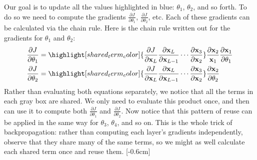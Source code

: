 Our goal is to update all the values highlighted in blue: $\theta_1$, $\theta_2$, and so forth. To do so we need to compute the gradients $\frac{\partial J}{\partial \theta_1}$, $\frac{\partial J}{\partial \theta_2}$, etc. Each of these gradients can be calculated via the chain rule. Here is the chain rule written out for the gradients for $\theta_1$ and $\theta_2$:
\begin{align}
    \frac{\partial J}{\partial \theta_1} &= \highlight[shared_term_color]{\frac{\partial J}{\partial \mathbf{x}_L}\frac{\partial \mathbf{x}_L}{\partial \mathbf{x}_{L-1}} \cdots \frac{\partial \mathbf{x}_3}{\partial \mathbf{x}_2}} \frac{\partial \mathbf{x}_2}{\mathbf{x}_1}\frac{\partial \mathbf{x}_1}{\partial \mathbf{\theta}_1}\\
    \frac{\partial J}{\partial \theta_2} &=  \highlight[shared_term_color]{\frac{\partial J}{\partial \mathbf{x}_{L}}\frac{\partial \mathbf{x}_L}{\partial \mathbf{x}_{L-1}} \cdots \frac{\partial \mathbf{x}_3}{\partial \mathbf{x}_2}} \frac{\partial \mathbf{x}_2}{\partial \theta_2}
\end{align}
Rather than evaluating both equations separately, we notice that all the terms in each gray box are shared. We only need to evaluate this product once, and then can use it to compute both $\frac{\partial J}{\partial \theta_1}$ and $\frac{\partial J}{\partial \theta_2}$. Now notice that this pattern of reuse can be applied in the same way for $\theta_3$, $\theta_4$, and so on. This is the whole trick of backpropagation: rather than computing each layer's gradients independently, observe that they share many of the same terms, so we might as well calculate each shared term once and reuse them. [-0.6cm]

